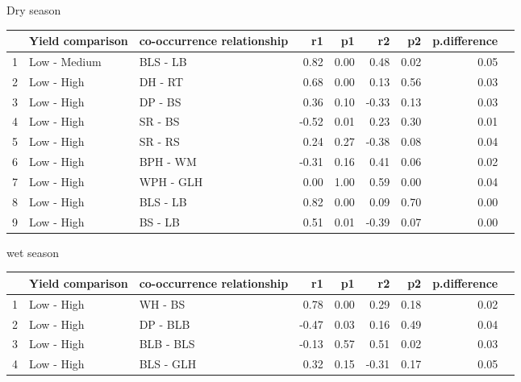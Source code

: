 Dry season 

\begin{table}[ht]
\centering
\begin{tabular}{lllrrrrrr}
  \hline
 & Yield comparison & co-occurrence relationship & r1 & p1 & r2 & p2 & p.difference \\ 
  \hline
1 & Low - Medium & BLS - LB & 0.82 & 0.00 & 0.48 & 0.02 & 0.05  \\ 
  2 & Low - High & DH - RT & 0.68 & 0.00 & 0.13 & 0.56 & 0.03  \\ 
  3 & Low - High & DP - BS & 0.36 & 0.10 & -0.33 & 0.13 & 0.03  \\ 
  4 & Low - High & SR - BS & -0.52 & 0.01 & 0.23 & 0.30 & 0.01  \\ 
  5 & Low - High & SR - RS & 0.24 & 0.27 & -0.38 & 0.08 & 0.04  \\ 
  6 & Low - High & BPH - WM & -0.31 & 0.16 & 0.41 & 0.06 & 0.02  \\ 
  7 & Low - High & WPH - GLH & 0.00 & 1.00 & 0.59 & 0.00 & 0.04  \\ 
  8 & Low - High & BLS - LB & 0.82 & 0.00 & 0.09 & 0.70 & 0.00  \\ 
  9 & Low - High & BS - LB & 0.51 & 0.01 & -0.39 & 0.07 & 0.00  \\ 
   \hline
\end{tabular}
\end{table}

wet season

\begin{table}[ht]
\centering
\begin{tabular}{lllrrrrrr}
  \hline
 & Yield comparison & co-occurrence relationship & r1 & p1 & r2 & p2 & p.difference \\ 
  \hline
  1 & Low - High & WH - BS & 0.78 & 0.00 & 0.29 & 0.18 & 0.02 \\ 
  2 & Low - High & DP - BLB & -0.47 & 0.03 & 0.16 & 0.49 & 0.04  \\ 
  3 & Low - High & BLB - BLS & -0.13 & 0.57 & 0.51 & 0.02 & 0.03  \\ 
  4 & Low - High & BLS - GLH & 0.32 & 0.15 & -0.31 & 0.17 & 0.05 \\ 
   \hline
\end{tabular}
\end{table}